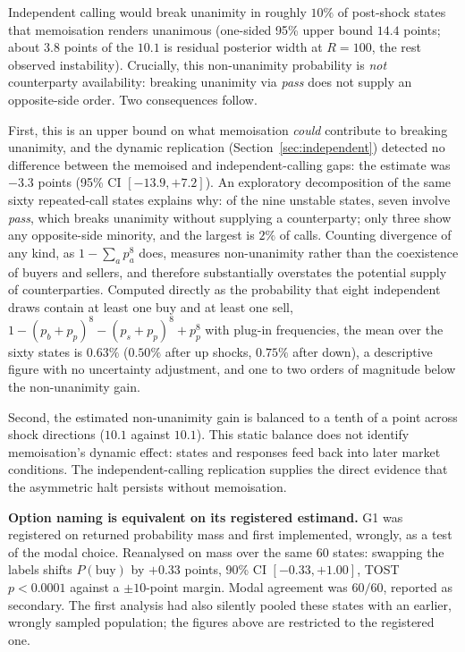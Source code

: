 \documentclass[11pt]{article}
\begin{document}
Independent calling would break unanimity in roughly $10\%$ of post-shock states
that memoisation renders unanimous (one-sided 95\% upper bound $14.4$ points;
about $3.8$ points of the $10.1$ is residual posterior width at $R=100$, the
rest observed instability). Crucially, this non-unanimity probability is
\emph{not} counterparty availability: breaking unanimity via \emph{pass} does
not supply an opposite-side order. Two consequences follow.

First, this is an upper bound on what memoisation \emph{could} contribute to
breaking unanimity, and the dynamic replication (Section~\ref{sec:independent})
detected no difference between the memoised and independent-calling gaps: the
estimate was $-3.3$ points (95\% CI $[-13.9, +7.2]$). An exploratory
decomposition of the same sixty repeated-call states explains why: of the nine
unstable states, seven involve \emph{pass}, which breaks unanimity without
supplying a counterparty; only three show any opposite-side minority, and the
largest is $2\%$ of calls. Counting divergence of any kind, as
$1-\sum_a p_a^8$ does, measures non-unanimity rather than the coexistence of
buyers and sellers, and therefore substantially overstates the potential supply
of counterparties. Computed directly as the probability that eight independent
draws contain at least one buy and at least one sell,
$1-(p_b+p_p)^8-(p_s+p_p)^8+p_p^8$ with plug-in frequencies, the mean over the
sixty states is $0.63\%$ ($0.50\%$ after up shocks, $0.75\%$ after down), a
descriptive figure with no uncertainty adjustment, and one to two orders of
magnitude below the non-unanimity gain.

Second, the estimated non-unanimity gain is balanced to a tenth of a point
across shock directions ($10.1$ against $10.1$). This static balance does not
identify memoisation's dynamic effect: states and responses feed back into
later market conditions. The independent-calling replication supplies the
direct evidence that the asymmetric halt persists without memoisation.

\textbf{Option naming is equivalent on its registered estimand.} G1 was
registered on returned probability mass and first implemented, wrongly, as a
test of the modal choice. Reanalysed on mass over the same 60 states: swapping
the labels shifts $P(\text{buy})$ by $+0.33$ points, 90\% CI
$[-0.33, +1.00]$, TOST $p<0.0001$ against a $\pm 10$-point margin. Modal
agreement was $60/60$, reported as secondary. The first analysis had also
silently pooled these states with an earlier, wrongly sampled population; the
figures above are restricted to the registered one.
\end{document}
